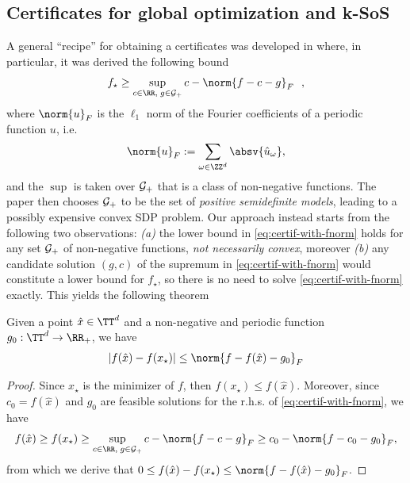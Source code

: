 \documentclass{article}
\begin{document}
\subsection{Certificates for global optimization and k-SoS}
A general ``recipe'' for obtaining a certificates was developed in \cite{woodworthNonConvexOptimizationCertificates2022}
where, in particular, it was  derived the following bound \citep[see Thm. 2]{woodworthNonConvexOptimizationCertificates2022}
\begin{equation}\label{eq:certif-with-fnorm}
  f_\star \geq \sup_{c \in \RR, \; g \in {\cal G}_+} c - \norm{f - c - g}_F ~~ ,
\end{equation}
where $\norm{u}_F$ is the $\ell_1$ norm of the Fourier coefficients of a periodic function $u$, i.e.
\begin{equation*}
  \norm{u}_F := \sum_{\omega \in \ZZ^d} \absv{\hat{u}_\omega},
\end{equation*}
and the $\sup$ is taken over ${\cal G}_+$ that is a class of non-negative functions. The paper \cite{woodworthNonConvexOptimizationCertificates2022} then chooses ${\cal G}_+$ to be the set of {\em positive semidefinite models}, leading to a possibly expensive convex SDP problem. Our approach instead starts from the following two observations: \emph{(a)} the lower bound in \cref{eq:certif-with-fnorm} holds for any set ${\cal G}_+$ of non-negative functions, {\em not necessarily convex}, moreover \emph{(b)} any candidate solution $(g, c)$ of the supremum in \cref{eq:certif-with-fnorm} would constitute a lower bound for $f_\star$, so there is no need to solve \cref{eq:certif-with-fnorm} exactly. This yields the following theorem

\begin{theorem}\label{thm:certificate}
  Given a point $\hat{x} \in \TT^d$ and a non-negative and periodic function $g_0: \TT^d \to \RR_+$, we have
  \begin{equation}
    |f(\hat{x}) - f(x_\star)| \leq \norm{f - f(\hat{x}) - g_0}_F
  \end{equation}
\end{theorem}
\begin{proof}
  Since $x_\star$ is the minimizer of $f$, then $f(x_\star) \leq f(\hat{x})$. Moreover, since $c_0 = f(\hat{x})$ and $g_0$ are feasible solutions for the r.h.s. of  \cref{eq:certif-with-fnorm}, we have
  \begin{equation*}
    f(\hat{x}) \geq f(x_\star) \geq \sup_{c \in \RR, \; g \in {\cal G}_+} c - \norm{f - c - g}_F  \geq  c_0 - \norm{f - c_0 - g_0}_F,
  \end{equation*}
  from which we derive that  $0 \leq f(\hat{x}) - f(x_\star) \leq \norm{f - f(\hat{x}) - g_0}_F$.
\end{proof}
\end{document}

